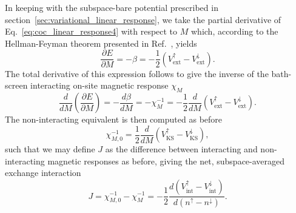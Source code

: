 {In keeping with the subspace-bare potential 
prescribed in section~\ref{sec:variational_linear_response}, 
we take the partial derivative of 
Eq.~\eqref{eq:coc_linear_response4}
with respect to $M$ which, 
according to the Hellman-Feyman theorem 
presented in Ref.~\cite{PhysRevB.94.035159}, 
yields} 
%
\begin{equation}
\frac{\partial E}{\partial M}=-\beta 
= -\frac{1}{2}\left(V_\textrm{ext}^\uparrow-V_\textrm{ext}^\downarrow \right).
\end{equation}
%
The total derivative of this expression follows to give 
the inverse of the bath-screen interacting 
on-site magnetic response $\chi_M$
%
\begin{equation}
\frac{d}{dM}\left(\frac{\partial E}{\partial M}\right)
=-\frac{d\beta}{dM} = -\chi_M^{-1}
= -\frac{1}{2}\frac{d}{dM}\left(V_\textrm{ext}^\uparrow-V_\textrm{ext}^\downarrow \right). 
\end{equation}
%
The non-interacting equivalent is then 
computed as before  
%
\begin{equation}
\chi_{M,0}^{-1}
= \frac{1}{2}\frac{d}{dM}\left(V_\textrm{KS}^\uparrow-V_\textrm{KS}^\downarrow \right), 
\end{equation}
%
such that we may define $J$ 
as the difference between interacting 
and non-interacting magnetic responses as before, 
giving the net, subspace-averaged exchange interaction 
%
\begin{equation}
J=\chi_{M,0}^{-1}-\chi_M^{-1}
=-\frac{1}{2}\frac{d(V_\textrm{int}^\uparrow-V_\textrm{int}^\downarrow)}{d(n^\uparrow-n^\downarrow)}.
\label{eq:j_definition}
\end{equation}
%

